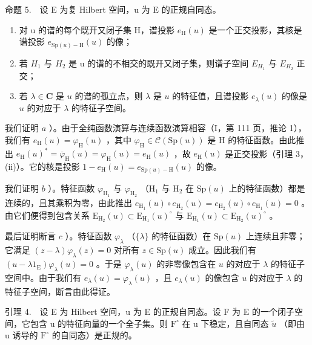 命题 5.　设 E 为复 Hilbert 空间，u 为 E 的正规自同态。

\begin{enumerate}
\def\labelenumi{\alph{enumi})}
\item
  对 u 的谱的每个既开又闭子集 H，谱投影 \(e_{\mathrm{H}}(u)\) 是一个正交投影，其核是谱投影 \(e_{\mathrm{Sp}(u)-\mathrm{H}}(u)\) 的像；
\item
  若 \(H_{1}\) 与 \(H_{2}\) 是 u 的谱的不相交的既开又闭子集，则谱子空间 \(E_{H_{1}}\) 与 \(E_{H_{2}}\) 正交；
\item
  若 \(\lambda \in \mathbf{C}\) 是 \(u\) 的谱的孤立点，则 \(\lambda\) 是 \(u\) 的特征值，且谱投影 \(e_{\lambda}(u)\) 的像是 \(u\) 的对应于 \(\lambda\) 的特征子空间。
\end{enumerate}

我们证明 \(a\) ）。由于全纯函数演算与连续函数演算相容（I，第 111 页，推论 1），我们有 \(e_{\mathrm{H}}(u) = \varphi_{\mathrm{H}}(u)\) ，其中 \(\varphi_{\mathrm{H}} \in \mathcal{C}(\mathrm{Sp}(u))\) 是 H 的特征函数。由此推出 \(e_{\mathrm{H}}(u)^{*} = \overline{\varphi}_{\mathrm{H}}(u) = \varphi_{\mathrm{H}}(u) = e_{\mathrm{H}}(u)\) ，故 \(e_{\mathrm{H}}(u)\) 是正交投影（引理 3，(ii)）。它的核是投影 \(1 - e_{\mathrm{H}}(u) = e_{\mathrm{Sp}(u) - \mathrm{H}}(u)\) 的像。

我们证明 \(b\) ）。特征函数 \(\varphi_{\mathrm{H}_{1}}\) 与 \(\varphi_{\mathrm{H}_{2}}\) （\(\mathrm{H}_{1}\) 与 \(\mathrm{H}_{2}\) 在 \(\mathrm{Sp}(u)\) 上的特征函数）都是连续的，且其乘积为零，由此推出 \(e_{\mathrm{H}_{1}}(u)\circ e_{\mathrm{H}_{2}}(u)=e_{\mathrm{H}_{2}}(u)\circ e_{\mathrm{H}_{1}}(u)=0\) 。由它们便得到包含关系 \(\mathrm{E}_{\mathrm{H}_{2}}(u)\subset\mathrm{E}_{\mathrm{H}_{1}}(u)^{\circ}\) 与 \(\mathrm{E}_{\mathrm{H}_{1}}(u)\subset\mathrm{E}_{\mathrm{H}_{2}}(u)^{\circ}\) 。

最后证明断言 \(c\) ）。特征函数 \(\varphi_{\lambda}\) （\(\{\lambda\}\) 的特征函数）在 \(\mathrm{Sp}(u)\) 上连续且非零；它满足 \((z - \lambda)\varphi_{\lambda}(z) = 0\) 对所有 \(z \in \mathrm{Sp}(u)\) 成立。因此我们有 \((u - \lambda 1_{\mathrm{E}})\varphi_{\lambda}(u) = 0\) 。于是 \(\varphi_{\lambda}(u)\) 的非零像包含在 \(u\) 的对应于 \(\lambda\) 的特征子空间中。由于我们有 \(e_{\lambda}(u) = \varphi_{\lambda}(u)\) ，且 \(e_{\lambda}(u)\) 的像包含 \(u\) 的对应于 \(\lambda\) 的特征子空间，断言由此得证。

引理 4.　设 E 为 Hilbert 空间，u 为 E 的正规自同态。设 F 为 E 的一个闭子空间，它包含 u 的特征向量的一个全子集。则 \(\mathrm{F}^{\circ}\) 在 u 下稳定，且自同态 \(\widetilde{u}\) （即由 u 诱导的 \(\mathrm{F}^{\circ}\) 的自同态）是正规的。

